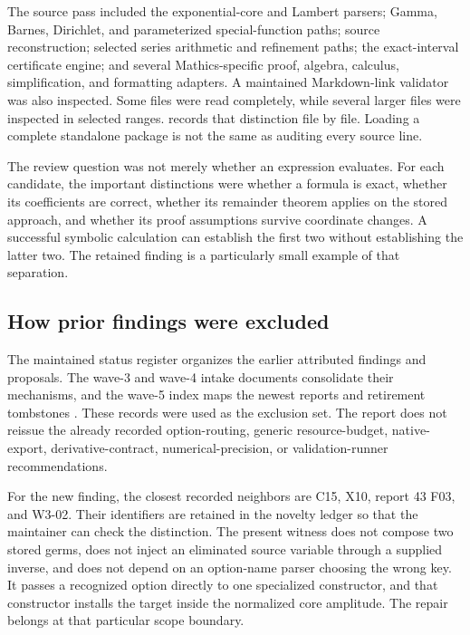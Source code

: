 \documentclass[11pt,letterpaper]{article}
\newcommand{\source}[1]{\path{#1}}
\begin{document}
The source pass included the exponential-core and Lambert parsers; Gamma, Barnes, Dirichlet, and parameterized special-function paths; source reconstruction; selected series arithmetic and refinement paths; the exact-interval certificate engine; and several Mathics-specific proof, algebra, calculus, simplification, and formatting adapters. A maintained Markdown-link validator was also inspected. Some files were read completely, while several larger files were inspected in selected ranges. \source{evidence/source_inventory.csv} records that distinction file by file. Loading a complete standalone package is not the same as auditing every source line.

The review question was not merely whether an expression evaluates. For each candidate, the important distinctions were whether a formula is exact, whether its coefficients are correct, whether its remainder theorem applies on the stored approach, and whether its proof assumptions survive coordinate changes. A successful symbolic calculation can establish the first two without establishing the latter two. The retained finding is a particularly small example of that separation.

\subsection{How prior findings were excluded}
The maintained status register organizes the earlier attributed findings and proposals. The wave-3 and wave-4 intake documents consolidate their mechanisms, and the wave-5 index maps the newest reports and retirement tombstones \cite{register,wave3,wave4,wave5}. These records were used as the exclusion set. The report does not reissue the already recorded option-routing, generic resource-budget, native-export, derivative-contract, numerical-precision, or validation-runner recommendations.

For the new finding, the closest recorded neighbors are C15, X10, report 43 F03, and W3-02. Their identifiers are retained in the novelty ledger so that the maintainer can check the distinction. The present witness does not compose two stored germs, does not inject an eliminated source variable through a supplied inverse, and does not depend on an option-name parser choosing the wrong key. It passes a recognized option directly to one specialized constructor, and that constructor installs the target inside the normalized core amplitude. The repair belongs at that particular scope boundary.
\end{document}
